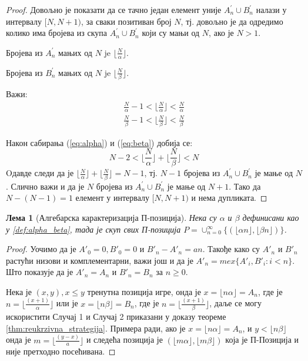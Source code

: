\documentclass[a4paper]{article}
\newtheorem{lemma}{Лема}
\begin{document}
\begin{proof}
	Довољно је показати да се тачно један елемент уније $ A_{n}^{'} \cup B_{n}^{'} $ налази у интервалу $ [N,N+1) $, за сваки позитиван број $ N $, тј. довољно је да одредимо колико има бројева из скупа $ A_{n}^{'} \cup B_{n}^{'} $ који су мањи од $ N $, ако је $ N > 1 $.
	
	Бројева из $ A_{n}^{'} $ мањих од $ N $ je $ \lfloor \frac{N}{\alpha} \rfloor $.
	
	Бројева из $ B_{n}^{'} $ мањих од $ N $ je $ \lfloor \frac{N}{\beta} \rfloor $.
	
	Важи:
		\begin{eqnarray}
			\frac{N}{\alpha} - 1 < \lfloor \frac{N}{\alpha} \rfloor < \frac{N}{\alpha} \label{eq:alpha}\\
			\frac{N}{\beta} - 1 < \lfloor \frac{N}{\beta} \rfloor < \frac{N}{\beta}
			\label{eq:beta}
		\end{eqnarray}
	
	Након сабирања (\ref{eq:alpha}) и (\ref{eq:beta}) добија се:
		\begin{displaymath}
		N - 2 < \lfloor \frac{N}{\alpha} \rfloor + \lfloor \frac{N}{\beta} \rfloor < N
		\end{displaymath} 
	Oдавде следи да је $ \lfloor \frac{N}{\alpha} \rfloor + \lfloor \frac{N}{\beta} \rfloor = N - 1 $, тј. $ N - 1 $ бројева из $ A_{n}^{'} \cup B_{n}^{'} $ је мање од $ N $. Слично важи и да је $ N $ бројева из $ A_{n}^{'} \cup B_{n}^{'} $ је мање од $ N + 1 $. Тако да $ N - (N - 1) = 1 $ елемент у интервалу $ [N,N+1) $ и нема дупликата.
\end{proof}

\begin{lemma}[Алгебарска карактеризација П-позиција] Нека су $ \alpha $ и $ \beta $ дефинисани као у \ref{def:alpha_beta}, тада је скуп свих П-позиција $ P = \cup_{n=0}^{\infty} \{(\lfloor \alpha n \rfloor, \lfloor \beta n \rfloor)\} $.
\end{lemma}

\begin{proof}
	Уочимо да је $ A'_{0} = 0, B'_{0} = 0 $ и $ B'_{n} - A'_{n} = an $. Такође како су $ A'_{n} $ и $ B'_{n} $ растући низови и комплементарни, важи још и да је $ A'_{n} = mex \{ A'_{i}, B'_{i} : i < n \} $. Што показује да је $ A'_{n} = A_{n} $ и $ B'_{n} = B_{n}  $ за $ n \ge 0 $.
	
	Нека је $ (x, y), x \leq y $ тренутна позиција игре, онда је $ x = \lfloor n \alpha \rfloor = A_{n} $, где је $ n = \lfloor \frac{(x+1)}{\alpha} \rfloor $ или је $ x = \lfloor n \beta \rfloor = B_{n} $, где је $ n = \lfloor \frac{(x+1)}{\beta} \rfloor $, даље се могу искористити Случај 1 и Случај 2 приказани у доказу теореме \ref{thm:reukrzivna_strategija}. Примера ради, ако је $ x = \lfloor n \alpha \rfloor = A_{n} $, и $ y < \lfloor n \beta \rfloor $ онда је $ m = \lfloor
	\frac{(y-x)}{a} \rfloor $ и следећа позиција је $ (\lfloor m \alpha \rfloor, \lfloor m \beta \rfloor) $ која је П-Позиција и није претходно посећивана.
\end{proof}
\end{document}
